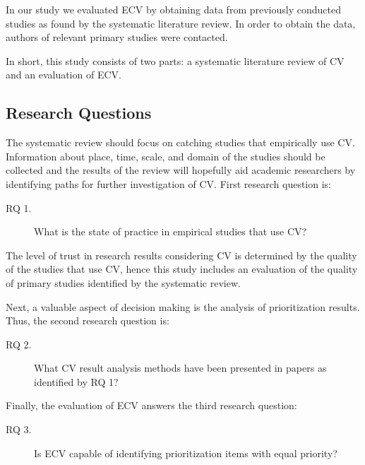 In our study we evaluated ECV by obtaining data from previously conducted studies as found by the systematic literature review. In order to obtain the data, authors of relevant primary studies were contacted.

In short, this study consists of two parts: a systematic literature review of CV and an evaluation of ECV.

\subsection{Research Questions}

The systematic review should focus on catching studies that empirically use CV. Information about place, time, scale, and domain of the studies should be collected and the results of the review will hopefully aid academic researchers by identifying paths for further investigation of CV. First research question is:
\begin{description}
\item[RQ 1.] What is the state of practice in empirical studies that use CV?
\end{description}

The level of trust in research results considering CV is determined by the quality of the studies that use CV, hence this study includes an evaluation of the quality of primary studies identified by the systematic review.

Next, a valuable aspect of decision making is the analysis of prioritization results.
Thus, the second research question is:
\begin{description}
\item[RQ 2.] What CV result analysis methods have been presented in papers as identified by RQ 1?
\end{description}

Finally, the evaluation of ECV answers the third research question:
\begin{description}
\item[RQ 3.] Is ECV capable of identifying prioritization items with equal priority?
\end{description}


